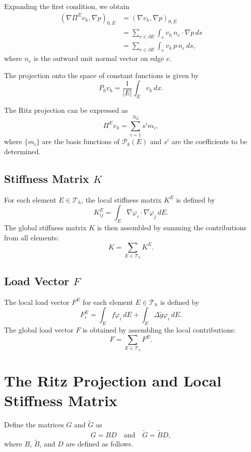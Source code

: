 \documentclass{report}
\begin{document}
Expanding the first condition, we obtain
\begin{align*}
(\nabla \Pi^E v_h, \nabla p)_{0,E} &= (\nabla v_h, \nabla p)_{0,E} \\
&= \sum_{e \in \partial E} \int_e v_h \, n_e \cdot \nabla p \, ds \\
&= \sum_{e \in \partial E} \int_e v_h \, p \, n_e \, ds,
\end{align*}
where $n_e$ is the outward unit normal vector on edge $e$.

The projection onto the space of constant functions is given by
\[
P_0 v_h = \frac{1}{|E|} \int_E v_h \, dx.
\]

The Ritz projection can be expressed as
\[
\Pi^E v_h = \sum_{i=1}^{N_E} s^i m_i,
\]
where $\{m_i\}$ are the basis functions of $\mathcal{P}_k(E)$ and $s^i$ are the coefficients to be determined.


\subsection{Stiffness Matrix $K$}
For each element $E \in \mathcal{T}_h$, the local stiffness matrix $K^E$ is defined by
\[
K^E_{ij} = \int_E \nabla \varphi_i \cdot \nabla \varphi_j \, dE.
\]
The global stiffness matrix $K$ is then assembled by summing the contributions from all elements:
\begin{equation}
    K = \sum_{E \in \mathcal{T}_h} K^E.
\end{equation}

\subsection{Load Vector $F$}
The local load vector $F^E$ for each element $E \in \mathcal{T}_h$ is defined by
\[
F^E_i = \int_E f \varphi_i \, dE + \int_E \Delta\tilde{g} \varphi_i \, dE.
\]
The global load vector $F$ is obtained by assembling the local contributions:
\begin{equation}
    F = \sum_{E \in \mathcal{T}_h} F^E.
\end{equation}

\section{The Ritz Projection and Local Stiffness Matrix}
Define the matrices $G$ and $\tilde{G}$ as
\[
G = BD \quad \text{and} \quad \tilde{G} = \tilde{B} D,
\]
where $B$, $\tilde{B}$, and $D$ are defined as follows.
\end{document}
